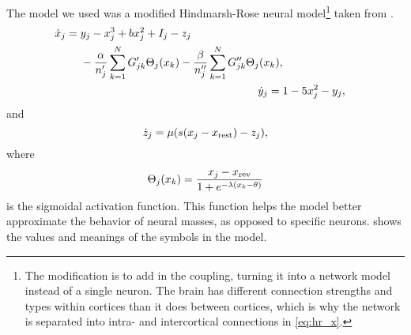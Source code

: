 The model we used was a modified Hindmarsh-Rose neural model\footnote{The modification is to add in the coupling, turning it into a network model instead of a single neuron.
  The brain has different connection strengths and types within cortices than it does between cortices, which is why the network is separated into intra- and intercortical connections in \cref{eq:hr_x}.} taken from \cite{Santos2017}.
\begin{align}
  \begin{split}
  \label{eq:hr_x}
  \dot{\hrx}_{j}
  ={}&
    \hry_{j}
    -
    \hrx_{j}^{3}
    +
    b \hrx_{j}^{2}
    +
    I_{j}
    -
    \hrz_{j} \\
    & -
    \frac{\hra}{n'_{j}} \sum_{k = 1}^{N} G'_{j k} \Theta_{j}(\hrx_{k})
    -
    \frac{\hrb}{n''_{j}} \sum_{k = 1}^{N} G''_{j k} \Theta_{j}(\hrx_{k}),
    \end{split} \\
  \label{eq:hr_y}
  \dot{\hry}_{j}
  ={}&
    1
    -
    5 \hrx_{j}^{2}
    -
    \hry_{j}, \\
\end{align}
and
\begin{equation}
  \label{eq:hr_z}
  \dot{\hrz}_{j}
  ={}
    \mu \pqty{s \pqty{\hrx_{j} - \hrx_{\text{rest}}} - \hrz_{j}},
\end{equation}
where
\begin{equation}
  \label{eq:hr_sigmoid}
  \Theta_{j}(\hrx_{k})
  =
  \frac{\hrx_{j} - \hrx_{\text{rev}}}{1 + e^{-\lambda \pqty{\hrx_{k} - \theta}}}
\end{equation}
is the sigmoidal activation function.
This function helps the model better approximate the behavior of neural masses, as opposed to specific neurons.
 shows the values and meanings of the symbols in the model.

